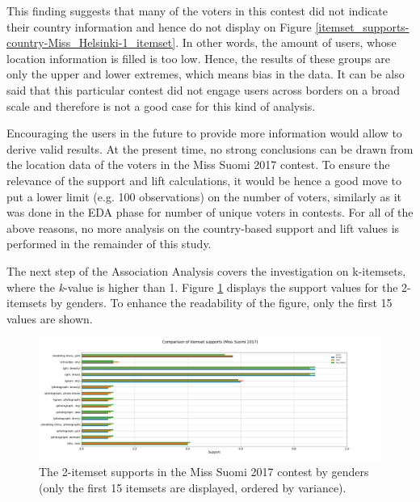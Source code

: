 This finding suggests that many of the voters in this contest did not indicate their country information and hence do not display on Figure \ref{itemset_supports-country-Miss_Helsinki-1_itemset}. In other words, the amount of users, whose location information is filled is too low. Hence, the results of these groups are only the upper and lower extremes, which means bias in the data. It can be also said that this particular contest did not engage users across borders on a broad scale and therefore is not a good case for this kind of analysis.

Encouraging the users in the future to provide more information would allow to derive valid results. At the present time, no strong conclusions can be drawn from the location data of the voters in the Miss Suomi 2017 contest. To ensure the relevance of the support and lift calculations, it would be hence a good move to put a lower limit (e.g. 100 observations) on the number of voters, similarly as it was done in the EDA phase for number of unique voters in contests. For all of the above reasons, no more analysis on the country-based support and lift values is performed in the remainder of this study.

\pagebreak

The next step of the Association Analysis covers the investigation on k-itemsets, where the \emph{k}-value is higher than 1. Figure \ref{itemset_supports-gender-Miss_Helsinki-2_itemset} displays the support values for the 2-itemsets by genders. To enhance the readability of the figure, only the first 15 values are shown. 

\begin{figure}[h] 
    \begin{center}
        \includegraphics[width=1.2\textwidth,center]{Images/itemset_supports-gender-Miss_Helsinki-2_itemset.png}
        \caption{The 2-itemset supports in the Miss Suomi 2017 contest by genders (only the first 15 itemsets are displayed, ordered by variance).}
        \label{itemset_supports-gender-Miss_Helsinki-2_itemset}
    \end{center}
\end{figure}

